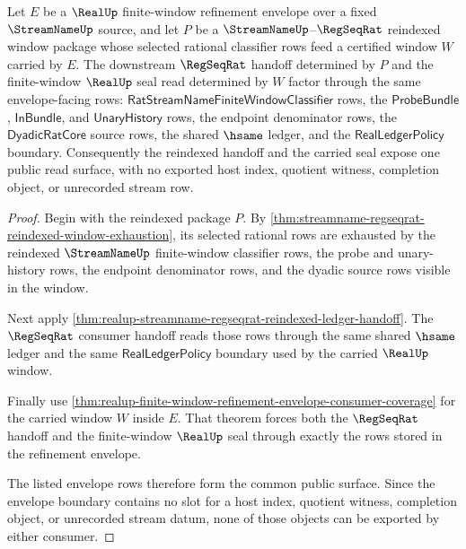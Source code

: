 \begin{theorem}
\label{thm:realup-refinement-envelope-reindexed-consumer-invariance}
Let $E$ be a $\RealUp$ finite-window refinement envelope over a fixed
$\StreamNameUp$ source, and let $P$ be a
$\StreamNameUp$--$\RegSeqRat$ reindexed window package whose selected rational
classifier rows feed a certified window $W$ carried by $E$. The downstream
$\RegSeqRat$ handoff determined by $P$ and the finite-window $\RealUp$ seal
read determined by $W$ factor through the same envelope-facing rows:
$\mathsf{RatStreamNameFiniteWindowClassifier}$ rows, the
$\mathsf{ProbeBundle}$, $\mathsf{InBundle}$, and $\mathsf{UnaryHistory}$ rows,
the endpoint denominator rows, the $\mathsf{DyadicRatCore}$ source rows, the
shared $\hsame$ ledger, and the $\mathsf{RealLedgerPolicy}$ boundary.
Consequently the reindexed handoff and the carried seal expose one public read
surface, with no exported host index, quotient witness, completion object, or
unrecorded stream row.
\end{theorem}
\begin{proof}
Begin with the reindexed package $P$. By
\autoref{thm:streamname-regseqrat-reindexed-window-exhaustion}, its selected
rational rows are exhausted by the reindexed $\StreamNameUp$ finite-window
classifier rows, the probe and unary-history rows, the endpoint denominator
rows, and the dyadic source rows visible in the window.

Next apply
\autoref{thm:realup-streamname-regseqrat-reindexed-ledger-handoff}. The
$\RegSeqRat$ consumer handoff reads those rows through the same shared
$\hsame$ ledger and the same $\mathsf{RealLedgerPolicy}$ boundary used by the
carried $\RealUp$ window.

Finally use
\autoref{thm:realup-finite-window-refinement-envelope-consumer-coverage} for
the carried window $W$ inside $E$. That theorem forces both the
$\RegSeqRat$ handoff and the finite-window $\RealUp$ seal through exactly the
rows stored in the refinement envelope.

The listed envelope rows therefore form the common public surface. Since the
envelope boundary contains no slot for a host index, quotient witness,
completion object, or unrecorded stream datum, none of those objects can be
exported by either consumer.
\end{proof}


